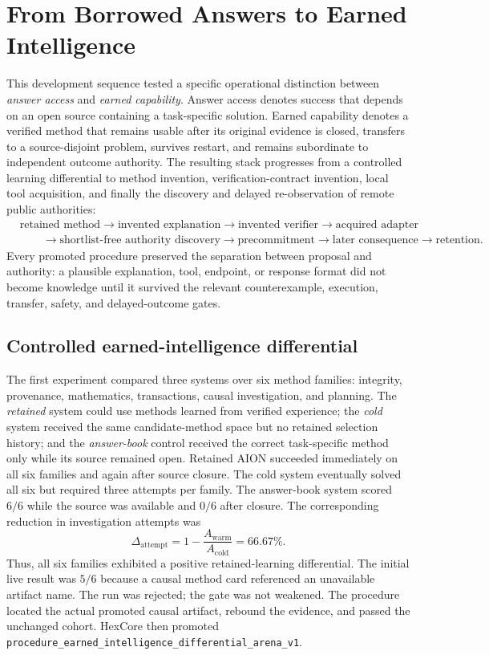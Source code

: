 \section{From Borrowed Answers to Earned Intelligence}
\label{sec:earned-intelligence-chain}

This development sequence tested a specific operational distinction between
\emph{answer access} and \emph{earned capability}.  Answer access denotes success
that depends on an open source containing a task-specific solution.  Earned
capability denotes a verified method that remains usable after its original
evidence is closed, transfers to a source-disjoint problem, survives restart,
and remains subordinate to independent outcome authority.  The resulting stack
progresses from a controlled learning differential to method invention,
verification-contract invention, local tool acquisition, and finally the
discovery and delayed re-observation of remote public authorities:
\[
\begin{aligned}
&\text{retained method}\rightarrow
\text{invented explanation}\rightarrow
\text{invented verifier}\rightarrow
\text{acquired adapter}\\
&\qquad\rightarrow
\text{shortlist-free authority discovery}\rightarrow
\text{precommitment}\rightarrow
\text{later consequence}\rightarrow
\text{retention}.
\end{aligned}
\]
Every promoted procedure preserved the separation between proposal and
authority: a plausible explanation, tool, endpoint, or response format did not
become knowledge until it survived the relevant counterexample, execution,
transfer, safety, and delayed-outcome gates.

\subsection{Controlled earned-intelligence differential}

The first experiment compared three systems over six method families:
integrity, provenance, mathematics, transactions, causal investigation, and
planning.  The \emph{retained} system could use methods learned from verified
experience; the \emph{cold} system received the same candidate-method space but
no retained selection history; and the \emph{answer-book} control received the
correct task-specific method only while its source remained open.  Retained
AION succeeded immediately on all six families and again after source closure.
The cold system eventually solved all six but required three attempts per
family.  The answer-book system scored $6/6$ while the source was available and
$0/6$ after closure.  The corresponding reduction in investigation attempts
was
\[
\Delta_{\mathrm{attempt}}
=1-\frac{A_{\mathrm{warm}}}{A_{\mathrm{cold}}}
=66.67\%.
\]
Thus, all six families exhibited a positive retained-learning differential.
The initial live result was $5/6$ because a causal method card referenced an
unavailable artifact name.  The run was rejected; the gate was not weakened.
The procedure located the actual promoted causal artifact, rebound the evidence,
and passed the unchanged cohort.  HexCore then promoted
\texttt{procedure\_earned\_intelligence\_differential\_arena\_v1}.

